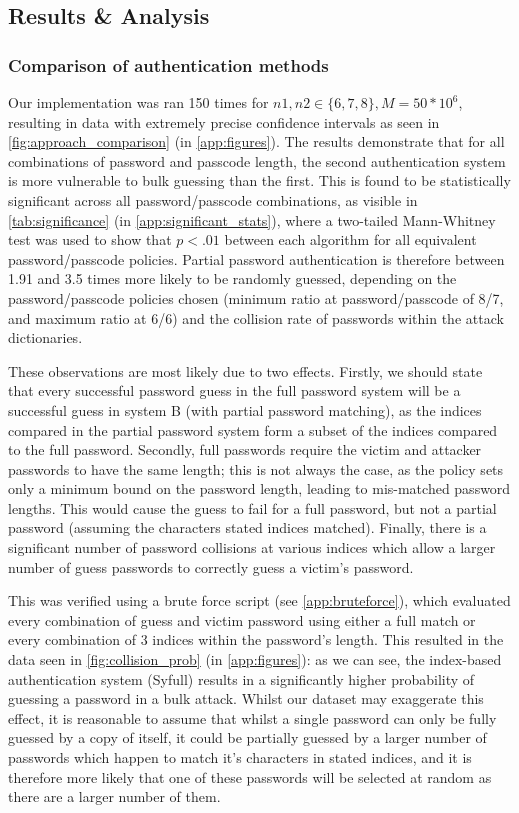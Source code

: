\documentclass[british,11pt,a4paper]{article}
\begin{document}
\subsection{Results \& Analysis}
\subsubsection{Comparison of authentication methods}
\label{subsec:authentication_methods}
Our implementation was ran 150 times for $n1, n2 \in \{6,7,8\}, M = 50 * 10^6$, resulting in data with extremely precise confidence intervals as seen in \autoref{fig:approach_comparison} (in \autoref{app:figures}). The results demonstrate that for all combinations of password and passcode length, the second authentication system is more vulnerable to bulk guessing than the first. This is found to be statistically significant across all password/passcode combinations, as visible in \autoref{tab:significance} (in \autoref{app:significant_stats}), where a two-tailed Mann-Whitney test was used to show that $p<.01$ between each algorithm for all equivalent password/passcode policies. Partial password authentication is therefore between 1.91 and 3.5 times more likely to be randomly guessed, depending on the password/passcode policies chosen (minimum ratio at password/passcode of 8/7, and maximum ratio at 6/6) and the collision rate of passwords within the attack dictionaries.

These observations are most likely due to two effects. Firstly, we should state that every successful password guess in the full password system will be a successful guess in system B (with partial password matching), as the indices compared in the partial password system form a subset of the indices compared to the full password. Secondly, full passwords require the victim and attacker passwords to have the same length; this is not always the case, as the policy sets only a minimum bound on the password length, leading to mis-matched password lengths. This would cause the guess to fail for a full password, but not a partial password (assuming the characters stated indices matched). Finally, there is a significant number of password collisions at various indices which allow a larger number of guess passwords to correctly guess a victim's password. 

This was verified using a brute force script (see \autoref{app:bruteforce}), which evaluated every combination of guess and victim password using either a full match or every combination of 3 indices within the password's length. This resulted in the data seen in \autoref{fig:collision_prob} (in \autoref{app:figures}): as we can see, the index-based authentication system (Syfull) results in a significantly higher probability of guessing a password in a bulk attack. Whilst our dataset may exaggerate this effect, it is reasonable to assume that whilst a single password can only be fully guessed by a copy of itself, it could be partially guessed by a larger number of passwords which happen to match it's characters in stated indices, and it is therefore more likely that one of these passwords will be selected at random as there are a larger number of them. 
\end{document}
